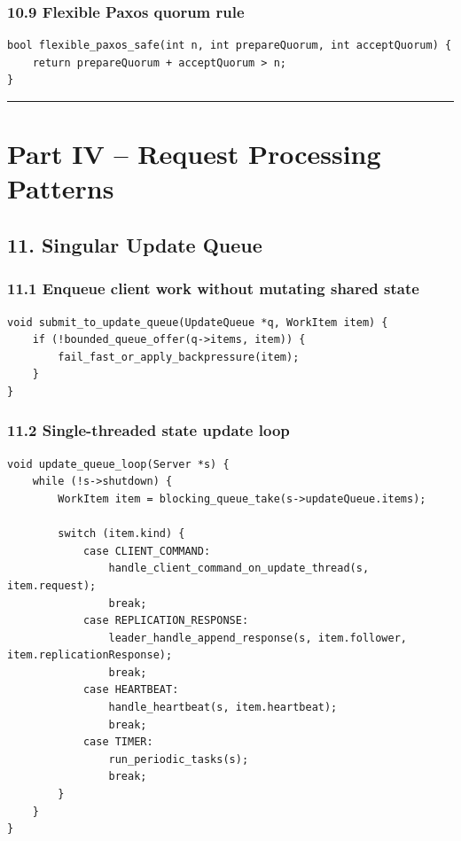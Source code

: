 \documentclass[10pt,letterpaper]{article}
\begin{document}
\subsubsection*{10.9 Flexible Paxos quorum rule}

\begin{verbatim}
bool flexible_paxos_safe(int n, int prepareQuorum, int acceptQuorum) {
    return prepareQuorum + acceptQuorum > n;
}
\end{verbatim}

\medskip\hrule\medskip

\clearpage
\section*{Part IV -- Request Processing Patterns}

\subsection*{11. Singular Update Queue}

\subsubsection*{11.1 Enqueue client work without mutating shared state}

\begin{verbatim}
void submit_to_update_queue(UpdateQueue *q, WorkItem item) {
    if (!bounded_queue_offer(q->items, item)) {
        fail_fast_or_apply_backpressure(item);
    }
}
\end{verbatim}

\subsubsection*{11.2 Single-threaded state update loop}

\begin{verbatim}
void update_queue_loop(Server *s) {
    while (!s->shutdown) {
        WorkItem item = blocking_queue_take(s->updateQueue.items);

        switch (item.kind) {
            case CLIENT_COMMAND:
                handle_client_command_on_update_thread(s, item.request);
                break;
            case REPLICATION_RESPONSE:
                leader_handle_append_response(s, item.follower, item.replicationResponse);
                break;
            case HEARTBEAT:
                handle_heartbeat(s, item.heartbeat);
                break;
            case TIMER:
                run_periodic_tasks(s);
                break;
        }
    }
}
\end{verbatim}
\end{document}
